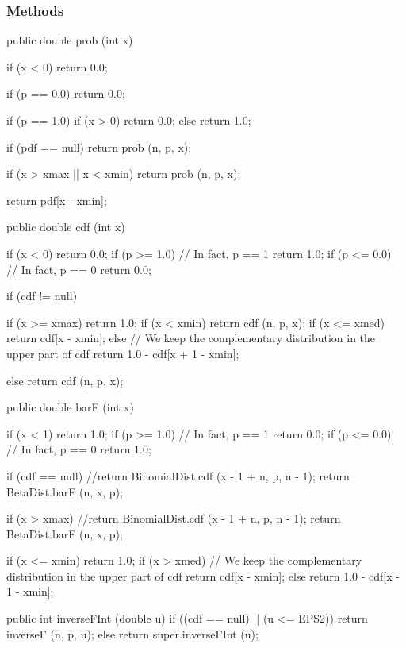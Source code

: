 \subsubsection* {Methods}
\begin{code}\begin{hide}
   public double prob (int x) {
      if (x < 0)
         return 0.0;

      if (p == 0.0)
         return 0.0;

      if (p == 1.0) {
         if (x > 0)
            return 0.0;
         else
            return 1.0;
      }

      if (pdf == null)
         return prob (n, p, x);

      if (x > xmax || x < xmin)
         return prob (n, p, x);

      return pdf[x - xmin];
   }

   public double cdf (int x) {
      if (x < 0)
         return 0.0;
      if (p >= 1.0)    // In fact, p == 1
         return 1.0;
      if (p <= 0.0)    // In fact, p == 0
         return 0.0;

      if (cdf != null) {
         if (x >= xmax)
            return 1.0;
         if (x < xmin)
            return cdf (n, p, x);
         if (x <= xmed)
            return cdf[x - xmin];
         else
            // We keep the complementary distribution in the upper part of cdf
            return 1.0 - cdf[x + 1 - xmin];

      }
      else
         return cdf (n, p, x);
   }

   public double barF (int x) {
      if (x < 1)
         return 1.0;
      if (p >= 1.0)   // In fact, p == 1
         return 0.0;
      if (p <= 0.0)   // In fact, p == 0
         return 1.0;

      if (cdf == null)
         //return BinomialDist.cdf (x - 1 + n, p, n - 1);
         return BetaDist.barF (n, x, p);

      if (x > xmax)
         //return BinomialDist.cdf (x - 1 + n, p, n - 1);
         return BetaDist.barF (n, x, p);

      if (x <= xmin)
         return 1.0;
      if (x > xmed)
         // We keep the complementary distribution in the upper part of cdf
         return cdf[x - xmin];
      else
         return 1.0 - cdf[x - 1 - xmin];
   }

   public int inverseFInt (double u) {
      if ((cdf == null) || (u <= EPS2))
         return inverseF (n, p, u);
      else
         return super.inverseFInt (u);
   }


\end{hide}
\end{code}
